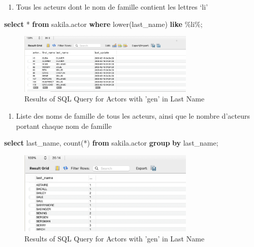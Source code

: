 \documentclass[12pt, french]{article}
\providecommand{\tightlist}{%
      \setlength{\itemsep}{0pt}\setlength{\parskip}{0pt}}
\newenvironment{Shaded}{}{}
\newcommand{\KeywordTok}[1]{\textcolor[rgb]{0.00,0.44,0.13}{\textbf{{#1}}}}
\newcommand{\StringTok}[1]{\textcolor[rgb]{0.25,0.44,0.63}{{#1}}}
\newcommand{\FunctionTok}[1]{\textcolor[rgb]{0.02,0.16,0.49}{{#1}}}
\newcommand{\NormalTok}[1]{{#1}}
\newcommand{\OperatorTok}[1]{\textcolor[rgb]{0.40,0.40,0.40}{{#1}}}
\begin{document}
\begin{enumerate}
\def\labelenumi{\arabic{enumi}.}
\setcounter{enumi}{1}
\tightlist
\item
  Tous les acteurs dont le nom de famille contient les lettres `li'
\end{enumerate}

\begin{Shaded}
\begin{Highlighting}[]
\KeywordTok{select} \OperatorTok{*} \KeywordTok{from}\NormalTok{ sakila.actor}
\KeywordTok{where} \FunctionTok{lower}\NormalTok{(last\_name) }\KeywordTok{like} \StringTok{\textquotesingle{}\%li\%\textquotesingle{}}\NormalTok{;}
\end{Highlighting}
\end{Shaded}

\begin{figure}[H] %
    \centering
    \includegraphics[width=0.75\textwidth]{res/Q2.png}
    \caption{Results of SQL Query for Actors with 'gen' in Last Name}
    \label{fig:actors_with_gen}
\end{figure}

\begin{enumerate}
\def\labelenumi{\arabic{enumi}.}
\setcounter{enumi}{2}
\tightlist
\item
  Liste des noms de famille de tous les acteurs, ainsi que le nombre
  d'acteurs portant chaque nom de famille
\end{enumerate}

\begin{Shaded}
\begin{Highlighting}[]
\KeywordTok{select}\NormalTok{ last\_name, }\FunctionTok{count}\NormalTok{(}\OperatorTok{*}\NormalTok{)}
\KeywordTok{from}\NormalTok{ sakila.actor}
\KeywordTok{group} \KeywordTok{by}\NormalTok{ last\_name;}
\end{Highlighting}
\end{Shaded}

\begin{figure}[H] %
    \centering
    \includegraphics[width=0.75\textwidth]{res/Q3.png}
    \caption{Results of SQL Query for Actors with 'gen' in Last Name}
    \label{fig:actors_with_gen}
\end{figure}
\end{document}
